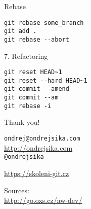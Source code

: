 \documentclass{beamer}
\begin{document}
\begin{frame}[fragile]

    {\LARGE Rebase}\\

    \begin{verbatim}
git rebase some_branch
git add .
git rebase --abort
    \end{verbatim}

\end{frame}

\begin{frame}[fragile]

    {\LARGE 7. Refactoring}\\

    \begin{verbatim}
git reset HEAD~1
git reset --hard HEAD~1
git commit --amend
git commit --am
git rebase -i
    \end{verbatim}

\end{frame}

\begin{frame}

    {\LARGE Thank you!}\\

    \vspace{1cm}

    \texttt{ondrej@ondrejsika.com}\\
    \url{http://ondrejsika.com}\\
    \texttt{@ondrejsika}\\

    \vspace{1cm}

    \url{https://skoleni-git.cz}\\

    \vspace{1cm}

    Sources:\\
    \url{http://go.oxs.cz/aw-dev/}
\end{frame}
\end{document}
